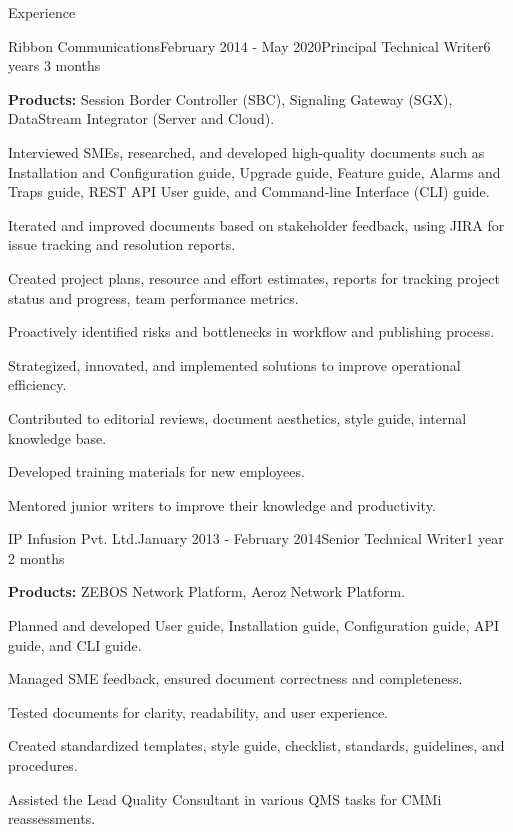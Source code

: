 \documentclass{resume} %
\begin{document}
\begin{rSection}{Experience}

\begin{rSubsection}{Ribbon Communications}{February 2014 - May 2020}{Principal Technical Writer}{6 years 3 months}
\item {\bf Products:} Session Border Controller (SBC), Signaling Gateway (SGX), DataStream Integrator (Server and Cloud).
\item Interviewed SMEs, researched, and developed high-quality documents such as Installation and Configuration guide, Upgrade guide, Feature guide, Alarms and Traps guide, REST API User guide, and Command‐line Interface (CLI) guide.
\item Iterated and improved documents based on stakeholder feedback, using JIRA for issue tracking and resolution reports.
\item Created project plans, resource and effort estimates, reports for tracking project status and progress, team performance metrics.
\item Proactively identified risks and bottlenecks in workflow and publishing process.
\item Strategized, innovated, and implemented solutions to improve operational efficiency.
\item Contributed to editorial reviews, document aesthetics, style guide, internal knowledge base.
\item Developed training materials for new employees.
\item Mentored junior writers to improve their knowledge and productivity.
\end{rSubsection}


\begin{rSubsection}{IP Infusion Pvt. Ltd.}{January 2013 - February 2014}{Senior Technical Writer}{1 year 2 months}
\item {\bf Products:} ZEBOS Network Platform, Aeroz Network Platform.
\item Planned and developed User guide, Installation guide, Configuration guide, API guide, and CLI guide.
\item Managed SME feedback, ensured document correctness and completeness.
\item Tested documents for clarity, readability, and user experience.
\item Created standardized templates, style guide, checklist, standards, guidelines, and procedures.
\item Assisted the Lead Quality Consultant in various QMS tasks for CMMi reassessments.
\end{rSubsection}


\end{rSection}
\end{document}
